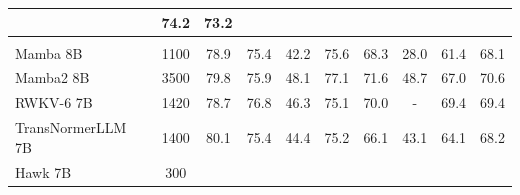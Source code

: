\begin{table}[ht]
\begin{center}
{\begin{tabular}{l|c|ccccc|c|cc}
                    & 74.2
                    & 73.2
                    \\
                    \midrule
                    \rowcolor[HTML]{F1E9E7}
                    \multicolumn{10}{l}{\textbf{\textit{Subquadratic}}}
                    \\
                    Mamba 8B~\citep{mamba}
                    & 1100
                    & 78.9
                    & 75.4
                    & 42.2
                    & 75.6
                    & 68.3
                    & 28.0
                    & 61.4
                    & 68.1
                    \\
                    Mamba2 8B~\citep{mamba2}
                    & 3500
                    & 79.8
                    & 75.9
                    & 48.1
                    & 77.1
                    & 71.6
                    & 48.7
                    & 67.0
                    & 70.6
                    \\
                    RWKV-6 7B~\citep{rwkv}
                    & 1420
                    & 78.7
                    & 76.8
                    & 46.3
                    & 75.1
                    & 70.0
                    & -
                    & 69.4
                    & 69.4
                    \\
                    TransNormerLLM 7B~\citep{transnormerllm}
                    & 1400
                    & 80.1
                    & 75.4
                    & 44.4
                    & 75.2
                    & 66.1
                    & 43.1
                    & 64.1
                    & 68.2
                    \\
                    Hawk 7B~\citep{griffin}
                    & 300

\end{tabular}}
\end{center}
\end{table}
